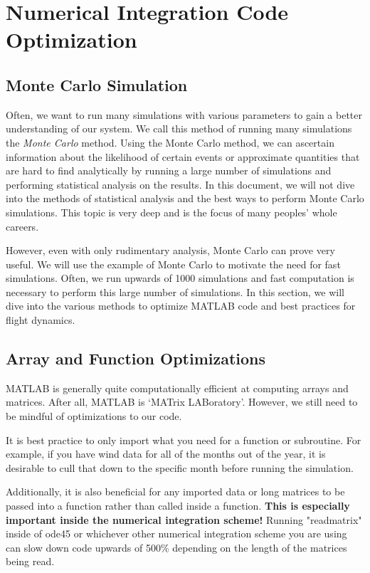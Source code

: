 \documentclass[12pt]{report}
\begin{document}
\section{Numerical Integration Code Optimization}\label{sec: code optimization}
\subsection{Monte Carlo Simulation}
Often, we want to run many simulations with various parameters to gain a better understanding of our system. We call this method of running many simulations the \textit{Monte Carlo} method. Using the Monte Carlo method, we can ascertain information about the likelihood of certain events or approximate quantities that are hard to find analytically by running a large number of simulations and performing statistical analysis on the results. In this document, we will not dive into the methods of statistical analysis and the best ways to perform Monte Carlo simulations. This topic is very deep and is the focus of many peoples’ whole careers.

However, even with only rudimentary analysis, Monte Carlo can prove very useful. We will use the example of Monte Carlo to motivate the need for fast simulations. Often, we run upwards of 1000 simulations and fast computation is necessary to perform this large number of simulations. In this section, we will dive into the various methods to optimize MATLAB code and best practices for flight dynamics.
\subsection{Array and Function Optimizations}
MATLAB is generally quite computationally efficient at computing arrays and matrices. After all, MATLAB is ‘MATrix LABoratory’. However, we still need to be mindful of optimizations to our code.

It is best practice to only import what you need for a function or subroutine. For example, if you have wind data for all of the months out of the year, it is desirable to cull that down to the specific month before running the simulation.

Additionally, it is also beneficial for any imported data or long matrices to be passed into a function rather than called inside a function. \textbf{This is especially important inside the numerical integration scheme! }Running "readmatrix" inside of ode45 or whichever other numerical integration scheme you are using can slow down code upwards of 500\% depending on the length of the matrices being read.
\end{document}
